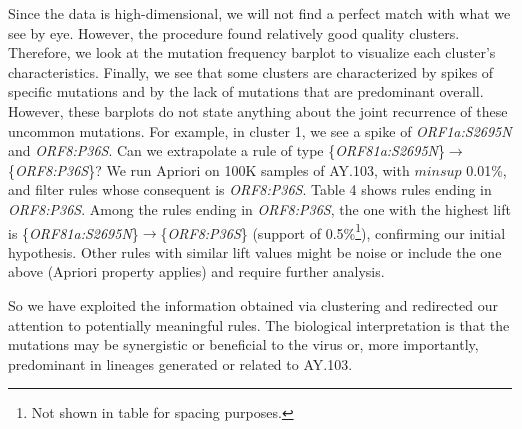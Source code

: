 \documentclass[twoside,twocolumn]{article}
\begin{document}
	Since the data is high-dimensional, we will not find a perfect match with what we see by eye. However, the procedure found relatively good quality clusters. Therefore, we look at the mutation frequency barplot to visualize each cluster's characteristics. Finally, we see that some clusters are characterized by spikes of specific mutations and by the lack of mutations that are predominant overall. However, these barplots do not state anything about the joint recurrence of these uncommon mutations. For example, in cluster 1, we see a spike of \textit{ORF1a:S2695N} and \textit{ORF8:P36S}. Can we extrapolate a rule of type \{\textit{ORF81a:S2695N}\}$\rightarrow$\{\textit{ORF8:P36S}\}? We run Apriori on 100K samples of AY.103, with $minsup$ 0.01\%, and filter rules whose consequent is \textit{ORF8:P36S}. Table 4 shows rules ending in \textit{ORF8:P36S}. Among the rules ending in \textit{ORF8:P36S}, the one with the highest lift is \{\textit{ORF81a:S2695N}\}$\rightarrow$\{\textit{ORF8:P36S}\} (support of 0.5\%\footnote{Not shown in table for spacing purposes.}), confirming our initial hypothesis. Other rules with similar lift values might be noise or include the one above (Apriori property applies) and require further analysis. 
	
	So we have exploited the information obtained via clustering and redirected our attention to potentially meaningful rules. The biological interpretation is that the mutations may be synergistic or beneficial to the virus or, more importantly, predominant in lineages generated or related to AY.103.
	
\end{document}
